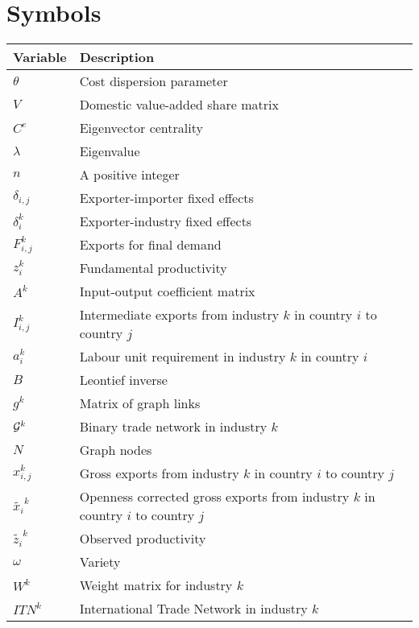 \documentclass[11pt,leqno,a4paper]{scrbook}
\begin{document}
\chapter*{Symbols}\label{sv}
\footnotesize
\begin{tabular}[h]{ll}
Variable & Description \\ \midrule
  $\theta$ & Cost dispersion parameter \\
$V$ & Domestic value-added share matrix \\
 $C^e$ & Eigenvector centrality \\
  $\lambda$  & Eigenvalue\\
$n$ & A positive integer \\
$\delta_{i,j}$& Exporter-importer fixed effects \\
$\delta^k_i$ & Exporter-industry fixed effects \\
  $F^k_{i,j}$& Exports for final demand \\
  $z_i^k$ & Fundamental productivity \\
  $A^k$ & Input-output coefficient matrix \\
 $I^k_{i,j}$ & Intermediate exports from  industry $k$ in country $i$ to country $j$   \\
$a^k_i $ & Labour unit requirement in industry $k$ in country $i$ \\
$B$ & Leontief inverse \\
$g^k$ & Matrix of graph links \\
$\mathcal{G}^k$ &Binary trade network in industry $k$ \\
$N$ & Graph nodes \\
$x^k_{i,j} $ & Gross exports from  industry $k$ in country $i$ to country $j$  \\
$\tilde{x_i}^k $ & Openness corrected gross exports from  industry $k$ in country $i$ to country $j$   \\
 $\tilde{z_i}^k$& Observed productivity \\
  $\omega$ & Variety \\
 $W^k$ & Weight matrix for industry $k$ \\
$ITN^k$& International Trade Network in industry $k$ \\ \bottomrule
\end{tabular}
\end{document}

